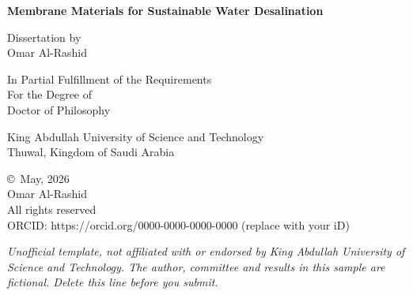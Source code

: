 \begin{titlepage}
\centering
\vspace*{0.6in}
{\bfseries Membrane Materials for Sustainable Water Desalination\par}
\vspace{0.5in}
Dissertation by\\
Omar Al-Rashid\par
\vspace{0.4in}
In Partial Fulfillment of the Requirements\\
For the Degree of\\
Doctor of Philosophy\par
\vspace{0.4in}
King Abdullah University of Science and Technology\\
Thuwal, Kingdom of Saudi Arabia\par
\vspace{0.5in}
\begin{singlespace}
\copyright\ May, 2026\\
Omar Al-Rashid\\
All rights reserved\\
ORCID: https://orcid.org/0000-0000-0000-0000 (replace with your iD)
\end{singlespace}
\vfill
{\footnotesize\itshape Unofficial template, not affiliated with or endorsed by King Abdullah University of Science and Technology. The author, committee and results in this sample are fictional. Delete this line before you submit.}
\end{titlepage}
\restoregeometry
